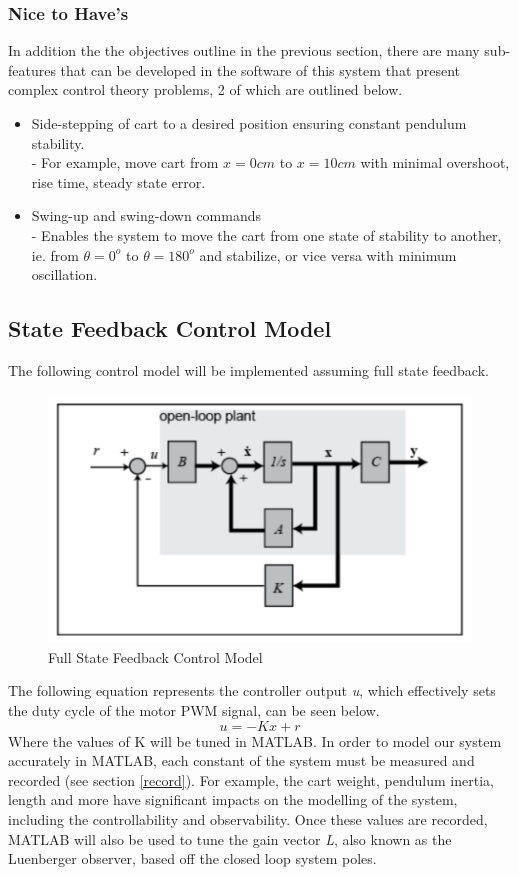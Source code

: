 \documentclass[12pt]{article}
\begin{document}
\subsubsection{Nice to Have's}
\label{nice}
In addition the the objectives outline in the previous section, there are many sub-features that can be developed in the software of this system that present complex control theory problems, 2 of which are outlined below.
\begin{itemize}
    \item Side-stepping of cart to a desired position ensuring constant pendulum stability.\\ \indent - For example, move cart from $x=0cm$ to $x=10cm$ with minimal overshoot, rise time, steady state error.
    \item Swing-up and swing-down commands\\ \indent - Enables the system to move the cart from one state of stability to another, ie. from $\theta =0^o$ to $\theta =180^o$ and stabilize, or vice versa with minimum oscillation.
\end{itemize}
\subsection{State Feedback Control Model}
\label{theory}
The following control model will be implemented assuming full state feedback.
\begin{figure}[H]
    \centering
    \includegraphics[width=.5\linewidth]{figures/fsfFlow.png}
    \caption{Full State Feedback Control Model  \cite{inv2}}
    \label{fig:fsf}
\end{figure}
The following equation represents the controller output \textit{u}, which effectively sets the duty cycle of the motor PWM signal, can be seen below.
\begin{equation}
    u = -Kx + r
\end{equation}
Where the values of K will be tuned in MATLAB. In order to model our system accurately in MATLAB, each constant of the system must be measured and recorded (see section \ref{record}). For example, the cart weight, pendulum inertia, length and more have significant impacts on the modelling of the system, including the controllability and observability. Once these values are recorded, MATLAB will also be used to tune the gain vector \textit{L}, also known as the Luenberger observer, based off the closed loop system poles.
\end{document}
